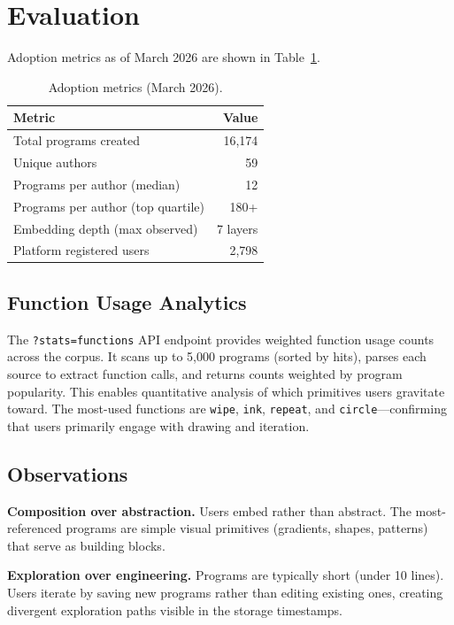 \documentclass[10pt,letterpaper,twocolumn]{article}
\begin{document}

\section{Evaluation}
\label{sec:evaluation}

Adoption metrics as of March 2026 are shown in Table~\ref{tab:adoption}.

\begin{table}[h]
\small
\centering
\begin{tabular}{lr}
\toprule
\textbf{Metric} & \textbf{Value} \\
\midrule
Total programs created & 16,174 \\
Unique authors & 59 \\
Programs per author (median) & 12 \\
Programs per author (top quartile) & 180+ \\
Embedding depth (max observed) & 7 layers \\
Platform registered users & 2,798 \\
\bottomrule
\end{tabular}
\caption{Adoption metrics (March 2026).}
\label{tab:adoption}
\end{table}

\subsection{Function Usage Analytics}

The \texttt{?stats=functions} API endpoint provides weighted function usage counts across the corpus. It scans up to 5,000 programs (sorted by hits), parses each source to extract function calls, and returns counts weighted by program popularity. This enables quantitative analysis of which primitives users gravitate toward. The most-used functions are \texttt{wipe}, \texttt{ink}, \texttt{repeat}, and \texttt{circle}---confirming that users primarily engage with drawing and iteration.

\subsection{Observations}

\textbf{Composition over abstraction.} Users embed rather than abstract. The most-referenced programs are simple visual primitives (gradients, shapes, patterns) that serve as building blocks.

\textbf{Exploration over engineering.} Programs are typically short (under 10 lines). Users iterate by saving new programs rather than editing existing ones, creating divergent exploration paths visible in the storage timestamps.
\end{document}

